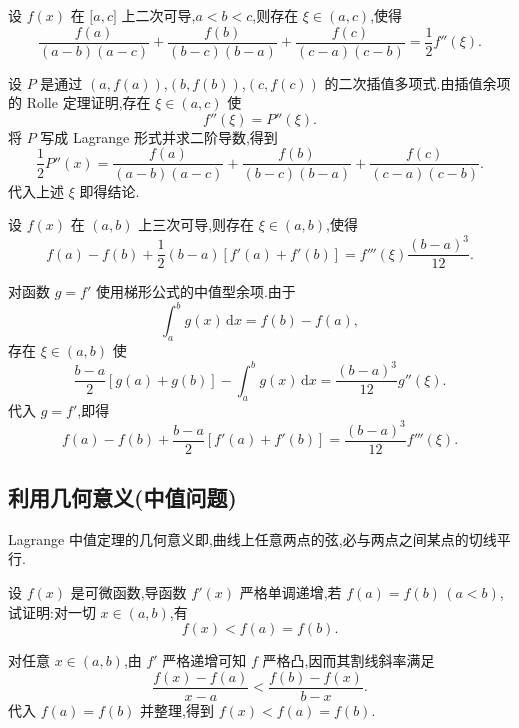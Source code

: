 \begin{example}
    设 $f(x)$ 在 $\lbrack a,c\rbrack$ 上二次可导,$a<b<c$,则存在 $\xi\in(a,c)$,使得
    \[
        \dfrac{f(a)}{(a-b)(a-c)}
        +\dfrac{f(b)}{(b-c)(b-a)}
        +\dfrac{f(c)}{(c-a)(c-b)}
        =\dfrac{1}{2}f''(\xi).
    \]
\end{example}
\exampleblank

\begin{solution}
    设 $P$ 是通过 $(a,f(a))$,$(b,f(b))$,$(c,f(c))$ 的二次插值多项式.由插值余项的 Rolle 定理证明,存在 $\xi\in(a,c)$ 使
    \[
        f''(\xi)=P''(\xi).
    \]
    将 $P$ 写成 Lagrange 形式并求二阶导数,得到
    \[
        \dfrac{1}{2}P''(x)
        =\dfrac{f(a)}{(a-b)(a-c)}
        +\dfrac{f(b)}{(b-c)(b-a)}
        +\dfrac{f(c)}{(c-a)(c-b)}.
    \]
    代入上述 $\xi$ 即得结论.
\end{solution}

\begin{example}
    设 $f(x)$ 在 $(a,b)$ 上三次可导,则存在 $\xi\in(a,b)$,使得
    \[
        f(a)-f(b)+\dfrac{1}{2}(b-a)[f'(a)+f'(b)]
        =f'''(\xi)\dfrac{(b-a)^3}{12}.
    \]
\end{example}
\exampleblank

\begin{solution}
    对函数 $g=f'$ 使用梯形公式的中值型余项.由于
    \[
        \displaystyle\int_a^b g(x)\,\mathrm{d}x=f(b)-f(a),
    \]
    存在 $\xi\in(a,b)$ 使
    \[
        \dfrac{b-a}{2}[g(a)+g(b)]
        -\int_a^b g(x)\,\mathrm{d}x
        =\dfrac{(b-a)^3}{12}g''(\xi).
    \]
    代入 $g=f'$,即得
    \[
        f(a)-f(b)+\dfrac{b-a}{2}[f'(a)+f'(b)]
        =\dfrac{(b-a)^3}{12}f'''(\xi).
    \]
\end{solution}



\subsection{利用几何意义(中值问题)}

Lagrange 中值定理的几何意义即,曲线上任意两点的弦,必与两点之间某点的切线平行.

\begin{example}
    设 $f(x)$ 是可微函数,导函数 $f'(x)$ 严格单调递增,若 $f(a)=f(b)\,(a<b)$,试证明:对一切 $x\in(a,b)$,有
    \[
        f(x)<f(a)=f(b).
    \]
\end{example}
\exampleblank

\begin{solution}
    对任意 $x\in(a,b)$,由 $f'$ 严格递增可知 $f$ 严格凸,因而其割线斜率满足
    \[
        \dfrac{f(x)-f(a)}{x-a}
        <\dfrac{f(b)-f(x)}{b-x}.
    \]
    代入 $f(a)=f(b)$ 并整理,得到 $f(x)<f(a)=f(b)$.
\end{solution}

